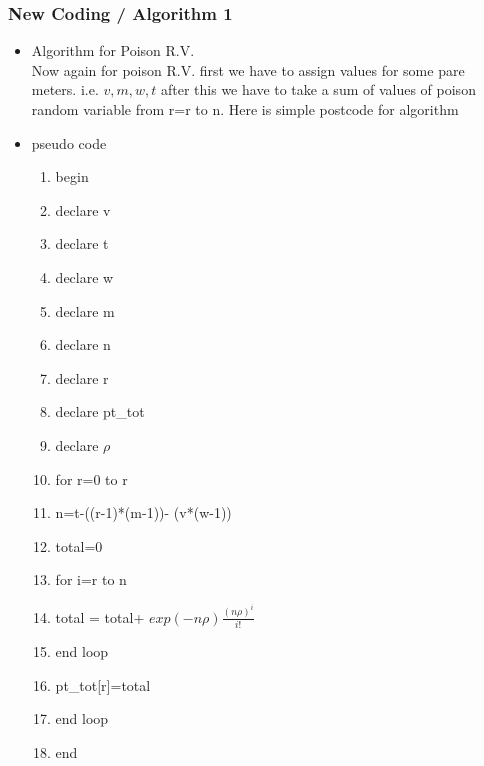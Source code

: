 \documentclass{article}
\begin{document}
\subsubsection{New Coding / Algorithm 1}
\begin{itemize}
    \item Algorithm for Poison R.V.\\
    Now again for poison R.V. first we have to assign values for some pare meters. i.e. $v,m,w,t$ after this we have to take a sum of values of poison random variable from r=r to n. Here is simple postcode for algorithm
    \item pseudo code
    \begin{enumerate}
        \item begin
        \item declare v
        \item declare t
        \item declare w
        \item declare m
        \item declare n
        \item declare r
        \item declare pt\_tot
        \item declare $\rho$
        \item for r=0 to r
        \item n=t-((r-1)*(m-1))- (v*(w-1))
        \item total=0
        \item for i=r to n
        \item total = total+ $exp(-n\rho)\frac{(n\rho)^i}{i!}$
        \item end loop
        \item pt\_tot[r]=total
        \item end loop
        \item end
    \end{enumerate}
\end{itemize}
\end{document}
